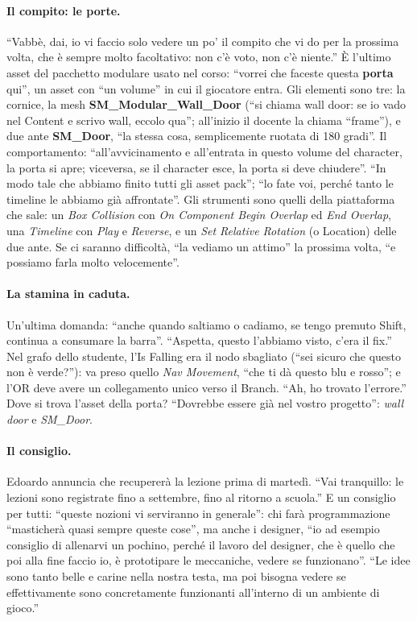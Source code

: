 \paragraph{Il compito: le porte.} ``Vabbè, dai, io vi faccio solo vedere un po' il compito
che vi do per la prossima volta, che è sempre molto facoltativo: non c'è voto, non c'è
niente.'' È l'ultimo asset del pacchetto modulare usato nel corso: ``vorrei che faceste
questa \textbf{porta} qui'', un asset con ``un volume'' in cui il giocatore entra. Gli
elementi sono tre: la cornice, la mesh \textbf{SM\_Modular\_Wall\_Door} (``si chiama wall
door: se io vado nel Content e scrivo wall, eccolo qua''; all'inizio il docente la chiama
``frame''), e due ante \textbf{SM\_Door}, ``la stessa cosa, semplicemente ruotata di 180
gradi''. Il comportamento: ``all'avvicinamento e all'entrata in questo volume del
character, la porta si apre; viceversa, se il character esce, la porta si deve
chiudere''. ``In modo tale che abbiamo finito tutti gli asset pack''; ``lo fate voi, perché
tanto le timeline le abbiamo già affrontate''. Gli strumenti sono quelli della piattaforma
che sale: un \emph{Box Collision} con \emph{On Component Begin Overlap} ed \emph{End
Overlap}, una \emph{Timeline} con \emph{Play} e \emph{Reverse}, e un \emph{Set Relative
Rotation} (o Location) delle due ante. Se ci saranno difficoltà, ``la vediamo un attimo''
la prossima volta, ``e possiamo farla molto velocemente''.

\paragraph{La stamina in caduta.} Un'ultima domanda: ``anche quando saltiamo o cadiamo, se
tengo premuto Shift, continua a consumare la barra''. ``Aspetta, questo l'abbiamo visto,
c'era il fix.'' Nel grafo dello studente, l'Is Falling era il nodo sbagliato (``sei sicuro
che questo non è verde?''): va preso quello \emph{Nav Movement}, ``che ti dà questo blu e
rosso''; e l'OR deve avere un collegamento unico verso il Branch. ``Ah, ho trovato
l'errore.'' Dove si trova l'asset della porta? ``Dovrebbe essere già nel vostro progetto'':
\emph{wall door} e \emph{SM\_Door}.

\paragraph{Il consiglio.} Edoardo annuncia che recupererà la lezione prima di martedì.
``Vai tranquillo: le lezioni sono registrate fino a settembre, fino al ritorno a scuola.''
E un consiglio per tutti: ``queste nozioni vi serviranno in generale'': chi farà
programmazione ``masticherà quasi sempre queste cose'', ma anche i designer, ``io ad
esempio consiglio di allenarvi un pochino, perché il lavoro del designer, che è quello che
poi alla fine faccio io, è prototipare le meccaniche, vedere se funzionano''. ``Le idee sono
tanto belle e carine nella nostra testa, ma poi bisogna vedere se effettivamente sono
concretamente funzionanti all'interno di un ambiente di gioco.''

